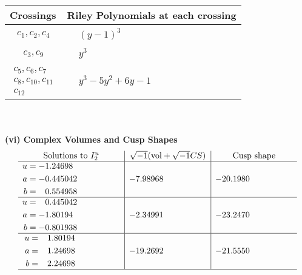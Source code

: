\documentclass[1p]{elsarticle_modified}
\theoremstyle{definition}
\newcommand{\I}{\sqrt{-1}}
\begin{document}
\begin{tabular}{m{50pt}|m{274pt}}
Crossings & \hspace{64pt}Riley Polynomials at each crossing \\
\hline $$\begin{aligned}c_{1},c_{2},c_{4}\end{aligned}$$&$\begin{aligned}
&(y-1)^3
\end{aligned}$\\
\hline $$\begin{aligned}c_{3},c_{9}\end{aligned}$$&$\begin{aligned}
&y^3
\end{aligned}$\\
\hline $$\begin{aligned}c_{5},c_{6},c_{7}\\c_{8},c_{10},c_{11}\\c_{12}\end{aligned}$$&$\begin{aligned}
&y^3-5 y^2+6 y-1
\end{aligned}$\\
\hline
\end{tabular}\\~\\
\newpage\flushleft \textbf{(vi) Complex Volumes and Cusp Shapes}
$$\begin{array}{c|c|c}  
\text{Solutions to }I^u_{2}& \I (\text{vol} + \sqrt{-1}CS) & \text{Cusp shape}\\
 \hline 
\begin{aligned}
u &= -1.24698\phantom{ +0.000000I} \\
a &= -0.445042\phantom{ +0.000000I} \\
b &= \phantom{-}0.554958\phantom{ +0.000000I}\end{aligned}
 & -7.98968\phantom{ +0.000000I} & -20.1980\phantom{ +0.000000I} \\ \hline\begin{aligned}
u &= \phantom{-}0.445042\phantom{ +0.000000I} \\
a &= -1.80194\phantom{ +0.000000I} \\
b &= -0.801938\phantom{ +0.000000I}\end{aligned}
 & -2.34991\phantom{ +0.000000I} & -23.2470\phantom{ +0.000000I} \\ \hline\begin{aligned}
u &= \phantom{-}1.80194\phantom{ +0.000000I} \\
a &= \phantom{-}1.24698\phantom{ +0.000000I} \\
b &= \phantom{-}2.24698\phantom{ +0.000000I}\end{aligned}
 & -19.2692\phantom{ +0.000000I} & -21.5550\phantom{ +0.000000I}\\
 \hline 
 \end{array}$$\newpage
\end{document}
